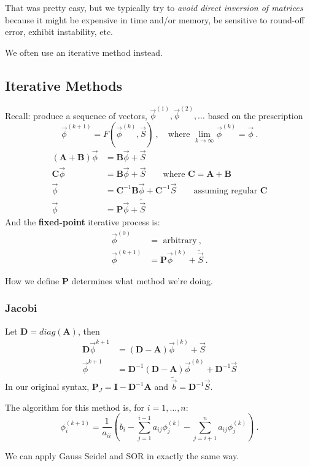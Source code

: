 \documentclass[12pt]{article}
\newcommand{\ve}[1]{\ensuremath{\mathbf{#1}}}
\begin{document}
That was pretty easy, but we typically try to \textit{avoid direct inversion of matrices} because it might be expensive in time and/or memory, be sensitive to round-off error, exhibit instability, etc.

We often use an iterative method instead. 


\subsection*{Iterative Methods}

Recall: produce a sequence of vectors, $\vec{\phi}^{(1)}, \vec{\phi}^{(2)}, \dots$ based on the prescription
  \[\vec{\phi}^{(k+1)} = F(\vec{\phi}^{(k)}, \vec{S})\:, \quad \text{where } \displaystyle \lim_{k \rightarrow \infty} \vec{\phi}^{(k)} = \vec{\phi}\:.\] 
%
\begin{align}
(\ve{A} + \ve{B}) \vec{\phi} &= \ve{B}\vec{\phi} + \vec{S} \nonumber \\
%
\ve{C} \vec{\phi} &= \ve{B}\vec{\phi} + \vec{S} 
\qquad\text{where } \ve{C} = \ve{A} + \ve{B} \nonumber \\
%
\vec{\phi} &= \ve{C}^{-1} \ve{B}\vec{\phi} + \ve{C}^{-1} \vec{S} 
\qquad\text{assuming regular } \ve{C}
\nonumber \\
%
\vec{\phi} &= \ve{P}\vec{\phi} + \tilde{\vec{S}}  
\nonumber
\end{align}
%
And the \textbf{fixed-point} iterative process is:
\begin{align}
\vec{\phi}^{(0)} &= \text{ arbitrary}\:,\nonumber \\
\vec{\phi}^{(k+1)} &= \ve{P}\vec{\phi}^{(k)} + \tilde{\vec{S}}\:. \nonumber
\end{align}

How we define $\ve{P}$ determines what method we're doing.

\subsubsection*{Jacobi}

Let $\ve{D} = diag(\ve{A})$, then
\begin{align}
\ve{D} \vec{\phi}^{k+1} &= (\ve{D} - \ve{A})\vec{\phi}^{(k)} + \vec{S} \nonumber \\
%
\vec{\phi}^{k+1} &= \ve{D}^{-1}(\ve{D} - \ve{A})\vec{\phi}^{(k)} + \ve{D}^{-1}\vec{S} \nonumber
\end{align}
%
In our original syntax, $\ve{P}_J = \ve{I} -  \ve{D}^{-1}\ve{A}$ and $\tilde{\vec{b}} =\ve{D}^{-1}\vec{S}$.

The algorithm for this method is, for $i = 1, \dots, n$:
\[ \phi^{(k+1)}_i = \frac{1}{a_{ii}}(b_i - \sum_{j=1}^{i-1} a_{ij} \phi_j^{(k)} - \sum_{j=i+1}^{n} a_{ij} \phi_j^{(k)})\:.\]

We can apply Gauss Seidel and SOR in exactly the same way. 




%
% 
\end{document}
